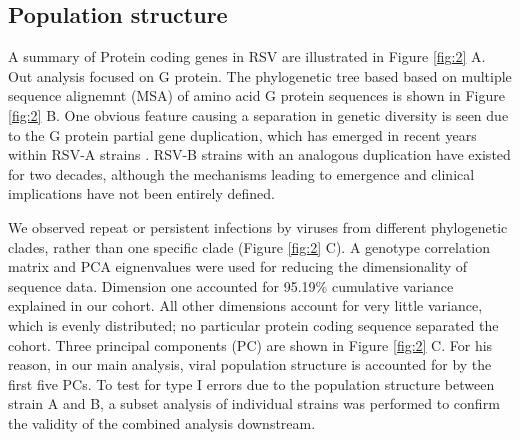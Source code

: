 \documentclass{article}
\begin{document}
\clearpage	

\subsection{Population structure}
A summary of Protein coding genes in RSV are illustrated in
Figure \ref{fig:2} A.
Out analysis focused on G protein.
The phylogenetic tree based based on multiple sequence alignemnt (MSA) of amino acid G protein sequences is shown in 
Figure \ref{fig:2} B.
One obvious feature causing a separation in genetic diversity is seen due to the G protein partial gene duplication, 
which has emerged in recent years within RSV-A strains 
\cite{eshaghi2012genetic}.
RSV-B strains with an analogous duplication have existed for two decades, 
although the mechanisms leading to emergence and clinical implications have not been entirely defined.

We observed repeat or persistent infections by viruses from different phylogenetic clades, rather than one specific clade 
(Figure \ref{fig:2} C).
A genotype correlation matrix and PCA eignenvalues were used for reducing the dimensionality of sequence data.
Dimension one accounted for 95.19\% cumulative variance explained in our cohort.
All other dimensions account for very little variance, which is evenly distributed; no particular protein coding sequence separated the cohort.
Three principal components (PC) are shown in Figure \ref{fig:2} C.
For his reason, in our main analysis, viral population structure is accounted for by the first five PCs. 
To test for type I errors due to the population structure between strain A and B, 
a subset analysis of individual strains was performed to confirm the validity of the combined analysis downstream.

\end{document}

